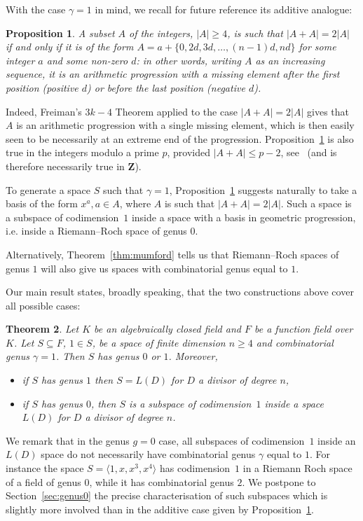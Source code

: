 \documentclass[10pt]{amsart}
\newtheorem{theo}{Theorem}[section]
\newtheorem{prop}[theo]{Proposition}
\theoremstyle{definition}
\theoremstyle{remark}
\newcommand*\Z{{\mathbf Z}}
\renewcommand{\geq}{\geqslant}
\renewcommand{\leq}{\leqslant}
\begin{document}
With the case $\gamma=1$ in mind, we recall for future reference its additive analogue:

\begin{prop}\label{prop:A+A=2A}
A subset $A$ of the integers, $|A|\geq4$, is such that $|A+A|=2|A|$ if and only if it is of the form $A=a+\{0,2d,3d,\ldots,(n-1)d,nd\}$ for some {integer $a$ and some} non-zero $d$: in other words, writing $A$ as an increasing sequence, it is an arithmetic progression with a missing element after the first position (positive $d$) or before the last position (negative $d$).
\end{prop}

Indeed, Freiman's $3k-4$ Theorem applied to the case $|A+A|=2|A|$ gives that $A$ is an arithmetic progression with a single missing element, which is then easily seen to be necessarily at an extreme end of the progression. Proposition~\ref{prop:A+A=2A} is also true in the integers modulo a prime $p$, provided $|A+A|\leq p-2$, see~\cite{hr00} (and is therefore necessarily true in $\Z$).

To generate a space $S$ such that $\gamma=1$, Proposition~\ref{prop:A+A=2A} suggests naturally to take a basis of the form $x^a, a\in A$, where $A$ is such that $|A+A|=2|A|$. Such a space is a subspace of codimension~$1$ inside a space with a basis in geometric progression, i.e. inside a Riemann--Roch space of genus $0$.

Alternatively, Theorem~\ref{thm:mumford} tells us that Riemann--Roch spaces of genus $1$ will also give us spaces with combinatorial genus equal to $1$.

Our main result states, broadly speaking, that the two constructions above cover all possible cases:

\begin{theo}\label{thm:main}
Let $K$ be an algebraically closed field and $F$ be a function field over $K$. Let $S \subseteq F$, $1\in S$, be a space of finite dimension $n\geq4$ and combinatorial genus $\gamma=1$. Then $S$ has genus $0$ or $1$. Moreover,
\begin{itemize}
\item if $S$ has genus $1$ then $S=L(D)$ for $D$ a divisor of degree $n$,
\item if $S$ has genus $0$, then $S$ is a subspace of codimension~$1$ inside a space $L(D)$ for $D$ a divisor of degree $n$.
\end{itemize}
\end{theo}

We remark that in the genus $g=0$ case, all subspaces of codimension~$1$ inside an $L(D)$ space do not necessarily have combinatorial genus $\gamma$ equal to $1$. { For instance the space $S=\langle 1, x, x^3, x^4 \rangle$ has codimension~$1$ in a Riemann Roch space of a field of genus $0$, while it has combinatorial genus $2$.} We postpone to Section~\ref{sec:genus0} the precise characterisation of such subspaces which is slightly more involved than in the additive case given by Proposition~\ref{prop:A+A=2A}.
\end{document}
